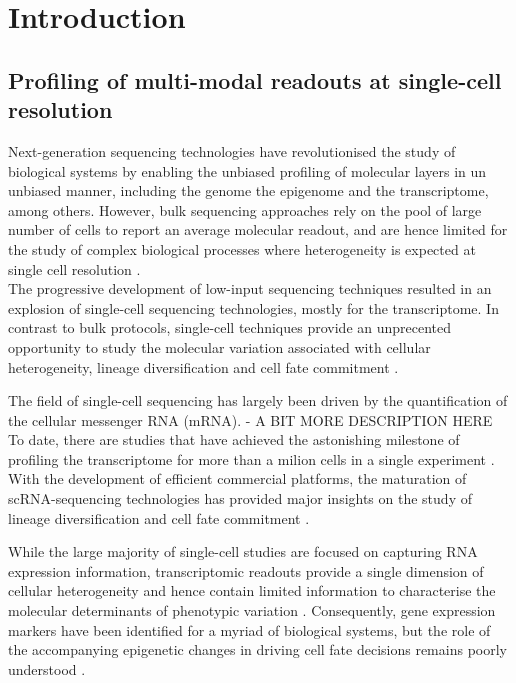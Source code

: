 \section{Introduction}

\subsection{Profiling of multi-modal readouts at single-cell resolution}

Next-generation sequencing technologies have revolutionised the study of biological systems by enabling the unbiased profiling of molecular layers in un unbiased manner, including the genome\cite{Fleischmann1995} the epigenome\cite{Frommer1992} and the transcriptome\cite{Lister2008,Bainbridge2006,Nagalakshmi2008,Mortazavi2008}, among others. However, bulk sequencing approaches rely on the pool of large number of cells to report an average molecular readout, and are hence limited for the study of complex biological processes where heterogeneity is expected at single cell resolution \cite{Griffiths2018,Papalexi2017,Patel2014}. \\
The progressive development of low-input sequencing techniques resulted in an explosion of single-cell sequencing technologies, mostly for the transcriptome. In contrast to bulk protocols, single-cell techniques provide an unprecented opportunity to study the molecular variation associated with cellular heterogeneity, lineage diversification and cell fate commitment \cite{Kolodziejczyk2015}.

The field of single-cell sequencing has largely been driven by the quantification of the cellular messenger RNA (mRNA). 
- A BIT MORE DESCRIPTION HERE
To date, there are studies that have achieved the astonishing milestone of profiling the transcriptome for more than a milion cells in a single experiment \cite{XX}. With the development of efficient commercial platforms, the maturation of scRNA-sequencing technologies has provided major insights on the study of lineage diversification and cell fate commitment \cite{Kolodziejczyk2015,Griffiths2018,Papalexi2017,Patel2014}.

While the large majority of single-cell studies are focused on capturing RNA expression information, transcriptomic readouts provide a single dimension of cellular heterogeneity and hence contain limited information to characterise the molecular determinants of phenotypic variation \cite{Ritchie2015}. Consequently, gene expression markers have been identified for a myriad of biological systems, but the role of the accompanying epigenetic changes in driving cell fate decisions remains poorly understood \cite{Griffiths2018,Kelsey2017,Bheda2014}.\\

